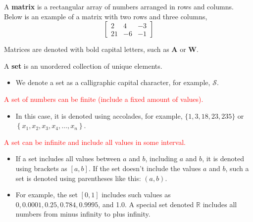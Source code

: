 \documentclass[10pt,dvipsnames]{beamer}
\begin{document}
\begin{frame}
	A \textbf{matrix} is a rectangular array of numbers arranged in rows and columns. Below is an example of a matrix with two rows and three columns,
	$$
	\left[\begin{array}{ccc}
		2 & 4 & -3 \\
		21 & -6 & -1
	\end{array}\right]
	$$
	
	Matrices are denoted with bold capital letters, such as \(\mathbf{A}\) or \(\mathbf{W}\).
	
	A \textbf{set} is an unordered collection of unique elements. 
	\begin{itemize}
		\item We denote a set as a calligraphic capital character, for example, $\mathcal{S}$.
	\end{itemize}
	 \textcolor{red}{A set of numbers can be finite (include a fixed amount of values).} 
	 \begin{itemize}
	 	\item  In this case, it is denoted using accolades, for example, $\{1,3,18,23,235\}$ or $\left\{x_{1}, x_{2}, x_{3}, x_{4}, \ldots, x_{n}\right\}$. 
	 \end{itemize}
	
	 \textcolor{red}{A set can be infinite and include all values in some interval.}
	 \begin{itemize}
	 	\item If a set includes all values between $a$ and $b$, including $a$ and $b$, it is denoted using brackets as $[a, b]$. If the set doesn't include the values $a$ and $b$, such a set is denoted using parentheses like this: $(a, b)$. 
	 \end{itemize}

	 \begin{itemize}
	 	\item For example, the set $[0,1]$ includes such values as $0,0.0001,0.25,0.784,0.9995$, and 1.0. A special set denoted $\mathbb{R}$ includes all numbers from minus infinity to plus infinity.
	 \end{itemize}

\end{frame}
\end{document}
